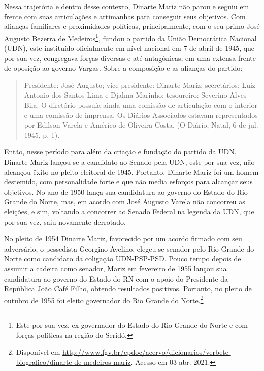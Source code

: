 \begin{refsection}
    Nessa trajetória e dentro desse contexto, Dinarte Mariz não parou e seguiu em frente com suas articulações e artimanhas para conseguir seus objetivos. Com alianças familiares e proximidades políticas, principalmente, com o seu primo José Augusto Bezerra de Medeiros\footnote{Este por sua vez, ex-governador do Estado do Rio Grande do Norte e com forças políticas na região do Seridó.}, fundou o partido da União Democrática Nacional (UDN), este instituído oficialmente em nível nacional em 7 de abril de 1945, que por sua vez, congregava forças diversas e até antagônicas, em uma extensa frente de oposição ao governo Vargas. Sobre a composição e as alianças do partido:

    \begin{quotation}
        Presidente: José Augusto; vice-presidente: Dinarte Mariz; secretários: Luiz Antonio dos Santos Lima e Djalma Marinho; tesoureiro: Severino Alves Bila. O diretório possuía ainda uma comissão de articulação com o interior e uma comissão de imprensa. Os Diários Associados estavam representados por Edilson Varela e Américo de Oliveira Costa. (O Diário, Natal, 6 de jul. 1945, p. 1).
    \end{quotation}

    Então, nesse período para além da criação e fundação do partido da UDN, Dinarte Mariz lançou-se a candidato ao Senado pela UDN, este por sua vez, não alcançou êxito no pleito eleitoral de 1945. Portanto, Dinarte Mariz foi um homem destemido, com personalidade forte e que não media esforços para alcançar seus objetivos. No ano de 1950 lança sua candidatura ao governo do Estado do Rio Grande do Norte, mas, em acordo com José Augusto Varela não concorreu as eleições, e sim, voltando a concorrer ao Senado Federal na legenda da UDN, que por sua vez, saiu novamente derrotado.  

    No pleito de 1954 Dinarte Mariz, favorecido por um acordo firmado com seu adversário, o pessedista Georgino Avelino, elegeu-se senador pelo Rio Grande do Norte como candidato da coligação UDN-PSP-PSD. Pouco tempo depois de assumir a cadeira como senador, Mariz em fevereiro de 1955 lançou sua candidatura ao governo do Estado do RN com o apoio do Presidente da República João Café Filho, obtendo resultados positivos. Portanto, no pleito de outubro de 1955 foi eleito governador do Rio Grande do Norte.\footnote{Disponível em \url{http://www.fgv.br/cpdoc/acervo/dicionarios/verbete-biografico/dinarte-de-medeiros-mariz}. Acesso em 03 abr. 2021.}


\end{refsection}
